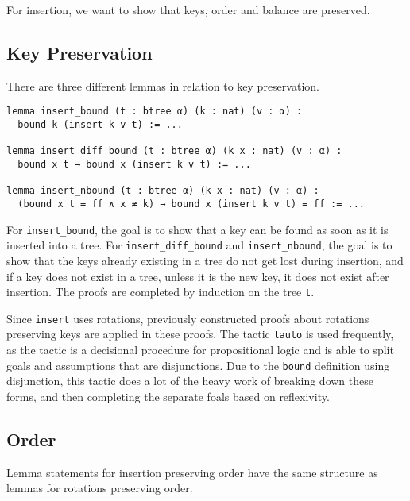 For insertion, we want to show that keys, order and balance are preserved.


\subsection*{Key Preservation}
There are three different lemmas in relation to key preservation.

\begin{lstlisting}
lemma insert_bound (t : btree α) (k : nat) (v : α) :
  bound k (insert k v t) := ...

lemma insert_diff_bound (t : btree α) (k x : nat) (v : α) :
  bound x t → bound x (insert k v t) := ...

lemma insert_nbound (t : btree α) (k x : nat) (v : α) :
  (bound x t = ff ∧ x ≠ k) → bound x (insert k v t) = ff := ...
\end{lstlisting}

For \lstinline{insert_bound}, the goal is to show that a key can be found as soon as it is inserted into a tree. For \lstinline{insert_diff_bound} and \lstinline{insert_nbound}, the goal is to show that the keys already existing in a tree do not get lost during insertion, and if a key does not exist in a tree, unless it is the new key, it does not exist after insertion. The proofs are completed by induction on the tree \lstinline{t}.

Since \lstinline{insert} uses rotations, previously constructed proofs about rotations preserving keys are applied in these proofs. The tactic \lstinline{tauto} is used frequently, as the tactic is a decisional procedure for propositional logic and is able to split goals and assumptions that are disjunctions. Due to the \lstinline{bound} definition using disjunction, this tactic does a lot of the heavy work of breaking down these forms, and then completing the separate foals based on reflexivity.

\subsection*{Order}
Lemma statements for insertion preserving order have the same structure as lemmas for rotations preserving order.

